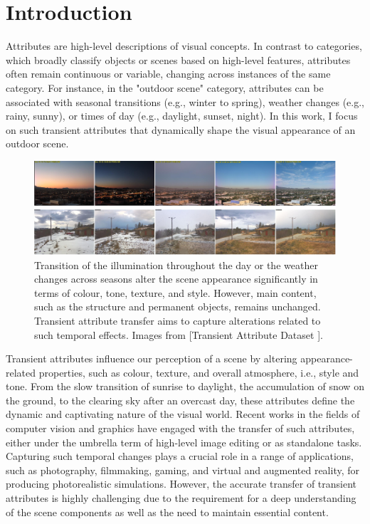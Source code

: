 \section{Introduction}\label{sec:zero-shot-intro}


Attributes are high-level descriptions of visual concepts. In contrast to categories, which broadly classify objects or scenes based on high-level features, attributes often remain continuous or variable, changing across instances of the same category. For instance, in the "outdoor scene" category, attributes can be associated with seasonal transitions (e.g., winter to spring), weather changes (e.g., rainy, sunny), or times of day (e.g., daylight, sunset, night). In this work, I focus on such transient attributes that dynamically shape the visual appearance of an outdoor scene.


\begin{figure}[ht]
  \includegraphics[width=\textwidth]{Chapters/zero-shot-tat-figs/tat-teaser.pdf}
  \caption{Transition of the illumination throughout the day or the weather changes across seasons alter the scene appearance significantly in terms of colour, tone, texture, and style. However, main content, such as the structure and permanent objects, remains unchanged. Transient attribute transfer aims to capture alterations related to such temporal effects. Images from [Transient Attribute Dataset \cite{laffont2014transient}].}
  \label{fig:zero-shot-teaser}
\end{figure}

Transient attributes influence our perception of a scene by altering appearance-related properties, such as colour, texture, and overall atmosphere, i.e., style and tone. From the slow transition of sunrise to daylight, the accumulation of snow on the ground, to the clearing sky after an overcast day, these attributes define the dynamic and captivating nature of the visual world. Recent works in the fields of computer vision and graphics have engaged with the transfer of such attributes, either under the umbrella term of high-level image editing or as standalone tasks. Capturing such temporal changes plays a crucial role in a range of applications, such as photography, filmmaking, gaming, and virtual and augmented reality, for producing photorealistic simulations. However, the accurate transfer of transient attributes is highly challenging due to the requirement for a deep understanding of the scene components as well as the need to maintain essential content.

